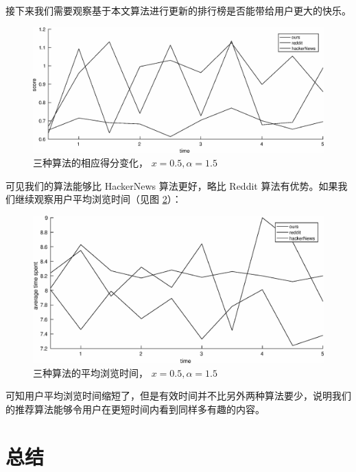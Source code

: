 \documentclass[UTF8]{ctexart}
\theoremstyle{plain}
\theoremstyle{definition}
\theoremstyle{remark}
\begin{document}
	接下来我们需要观察基于本文算法进行更新的排行榜是否能带给用户更大的快乐。
	\begin{figure}[h!] 
		\centering
		\includegraphics[width = \linewidth]{../model/douhu/pic/three-method-score.eps}
		\caption{三种算法的相应得分变化， $x=0.5, \alpha=1.5$}\label{fig:three-method-score}
	\end{figure}
	可见我们的算法能够比 HackerNews 算法更好，略比 Reddit 算法有优势。如果我们继续观察用户平均浏览时间（见图 \ref{fig:three-method-average-time}）：
	\begin{figure}[h!] 
		\centering
		\includegraphics[width = \linewidth]{../model/douhu/pic/three-method-average-time.eps}
		\caption{三种算法的平均浏览时间， $x=0.5, \alpha=1.5$}\label{fig:three-method-average-time}
	\end{figure}
	可知用户平均浏览时间缩短了，但是有效时间并不比另外两种算法要少，说明我们的推荐算法能够令用户在更短时间内看到同样多有趣的内容。

	\section{总结}
	
	
	\newpage
	\appendix
\end{document}
